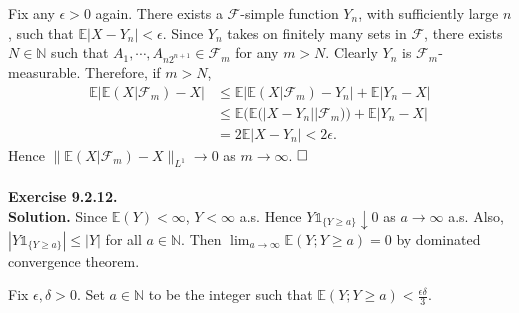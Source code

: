\documentclass[12pt]{extarticle}
\begin{document}
Fix any $\epsilon>0$ again. There exists a $\mathcal{F}$-simple function $Y_n$, with sufficiently large $n$, such that $\mathbb{E}|X-Y_n|<\epsilon$. Since $Y_n$ takes on finitely many sets in $\mathcal{F}$, there exists $N\in\mathbb{N}$ such that $A_1,\cdots,A_{n2^{n+1}}\in\mathcal{F}_m$ for any $m>N$. Clearly $Y_n$ is $\mathcal{F}_m$-measurable. Therefore, if $m>N$,
\begin{equation*}
\begin{aligned}
\mathbb{E}\big|\mathbb{E}(X|\mathcal{F}_m)-X\big| &\leq \mathbb{E}\big|\mathbb{E}(X|\mathcal{F}_m)-Y_n\big|+\mathbb{E}\big|Y_n-X\big| \\&
\leq
\mathbb{E}\big(\mathbb{E}(|X-Y_n||\mathcal{F}_m)\big)+\mathbb{E}|Y_n-X| \\&
=2\mathbb{E}|X-Y_n|<2\epsilon.
\end{aligned}
\end{equation*}
Hence $\|\mathbb{E}(X|\mathcal{F}_m)-X\|_{L^1}\rightarrow 0$ as $m\rightarrow\infty$.
$\hspace{\fill}\square$
\\ \\
\textbf{Exercise 9.2.12.}
\\
\textbf{Solution.} Since $\mathbb{E}(Y)<\infty$, $Y<\infty$ a.s. Hence $Y\mathds{1}_{\{Y\geq a\}}\downarrow 0$ as $a\rightarrow\infty$ a.s. Also, $|Y\mathds{1}_{\{Y\geq a\}}|\leq|Y|$ for all $a\in\mathbb{N}$. Then $\lim_{a\rightarrow\infty}\mathbb{E}(Y;Y\geq a)=0$ by dominated convergence theorem.

Fix $\epsilon,\delta>0$. Set $a\in\mathbb{N}$ to be the integer such that $\mathbb{E}(Y;Y\geq a)<\frac{\epsilon\delta}{3}$.
\end{document}
